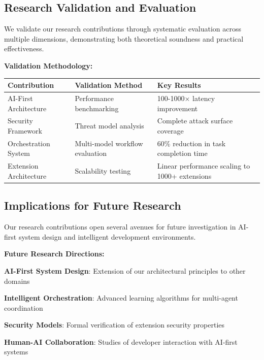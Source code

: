 \subsection{Research Validation and Evaluation}
\label{subsec:research-validation}

We validate our research contributions through systematic evaluation across multiple dimensions, demonstrating both theoretical soundness and practical effectiveness.

\textbf{Validation Methodology:}

\begin{center}
\begin{tabular}{@{}p{3cm}p{4cm}p{5cm}@{}}
\toprule
\textbf{Contribution} & \textbf{Validation Method} & \textbf{Key Results} \\
\midrule
AI-First Architecture & Performance benchmarking & 100-1000× latency improvement \\
Security Framework & Threat model analysis & Complete attack surface coverage \\
Orchestration System & Multi-model workflow evaluation & 60\% reduction in task completion time \\
Extension Architecture & Scalability testing & Linear performance scaling to 1000+ extensions \\
\bottomrule
\end{tabular}
\label{tab:validation-results}
\end{center}

\subsection{Implications for Future Research}
\label{subsec:future-implications}

Our research contributions open several avenues for future investigation in AI-first system design and intelligent development environments.

\textbf{Future Research Directions:}

\begin{infobox}[title=Research Impact and Future Work]
\begin{expandedlist}
    \item \textbf{AI-First System Design}: Extension of our architectural principles to other domains
    \item \textbf{Intelligent Orchestration}: Advanced learning algorithms for multi-agent coordination
    \item \textbf{Security Models}: Formal verification of extension security properties
    \item \textbf{Human-AI Collaboration}: Studies of developer interaction with AI-first systems
\end{expandedlist}
\end{infobox}

